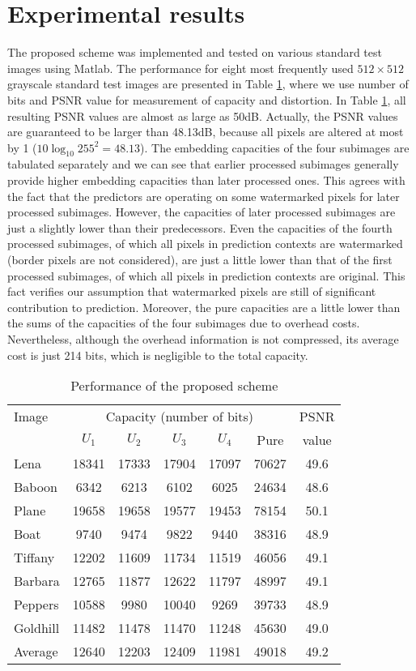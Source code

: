 \documentclass{article}
\begin{document}
\section{Experimental results} \label{sec:results}
The proposed scheme was implemented and tested on various standard test images using Matlab. The
performance for eight most frequently used $512 \times 512$ grayscale standard test images are
presented in Table \ref{tbl:performance}, where we use number of bits and PSNR value for measurement
of capacity and distortion. In Table \ref{tbl:performance}, all resulting PSNR values are almost as
large as 50dB. Actually, the PSNR values are guaranteed to be larger than 48.13dB, because all
pixels are altered at most by 1 ($10\log_{10}{255^2}=48.13$). The embedding capacities of the four
subimages are tabulated separately and we can see that earlier processed subimages generally provide
higher embedding capacities than later processed ones. This agrees with the fact that the predictors
are operating on some watermarked pixels for later processed subimages. However, the capacities of
later processed subimages are just a slightly lower than their predecessors. Even the capacities of
the fourth processed subimages, of which all pixels in prediction contexts are watermarked (border
pixels are not considered), are just a little lower than that of the first processed subimages, of
which all pixels in prediction contexts are original. This fact verifies our assumption that
watermarked pixels are still of significant contribution to prediction. Moreover, the pure
capacities are a little lower than the sums of the capacities of the four subimages due to overhead
costs. Nevertheless, although the overhead information is not compressed, its average cost is just
214 bits, which is negligible to the total capacity. 
\begin{table}
  \caption[Short title]{\label{tbl:performance}Performance of the proposed scheme} 
  \setlength{\tabcolsep}{1.4mm}
  \begin{tabular}{lcccccc} \hline
    Image & \multicolumn{5}{c}{Capacity (number of bits)} & PSNR\\ 
     & $U_1$ & $U_2$ & $U_3$ & $U_4$ & Pure & value  \\ \hline\hline
    Lena 	& 18341	& 17333	& 17904	& 17097	& 70627	& 49.6 \\
    Baboon	& 6342	& 6213	& 6102	& 6025	& 24634 & 48.6 \\
    Plane 	& 19658	& 19658	& 19577	& 19453	& 78154 & 50.1 \\
    Boat	& 9740	& 9474	& 9822	& 9440	& 38316	& 48.9 \\
    Tiffany 	& 12202 & 11609 & 11734 & 11519 & 46056 & 49.1 \\
    Barbara	& 12765	& 11877 & 12622 & 11797 & 48997 & 49.1 \\
    Peppers	& 10588 & 9980 	& 10040 & 9269 	& 39733 & 48.9 \\
    Goldhill	& 11482	& 11478	& 11470	& 11248	& 45630 & 49.0 \\ 
    Average	& 12640	& 12203 & 12409 & 11981 & 49018 & 49.2 \\ \hline
  \end{tabular}
\end{table}
\end{document}
